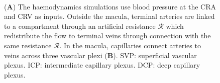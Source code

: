 \documentclass[11pt,]{article}
\begin{document}
\begin{figure}[ht!]
  \centering
  \begin{subfigure}[t]{.02\textwidth}
  \end{subfigure}
  \begin{subfigure}[t]{.95\textwidth}
    {
      \fontsize{3pt}{4pt}\selectfont%
      \def\svgwidth{\textwidth}    
    }
  \end{subfigure}
  \\
  \begin{subfigure}[t]{.02\textwidth}
  \end{subfigure}
  \begin{subfigure}[t]{.95\textwidth}
  \end{subfigure}

  \caption{ %
    (\textbf{A}) The haemodynamics simulations use blood pressure at the CRA and CRV as inputs.
    Outside the macula, terminal arteries are linked to a compartment through an artificial resistance $\mathcal{R}$
    which redistribute the flow to terminal veins through connection with the same resistance $\mathcal{R}$.
    In the macula, capillaries connect arteries to veins across three vascular plexi (\textbf{B}).
    SVP: superficial vascular plexus. ICP: intermediate capillary plexus. DCP: deep capillary plexus.
  }
  \label{fig:fig2}
\end{figure}
\end{document}
